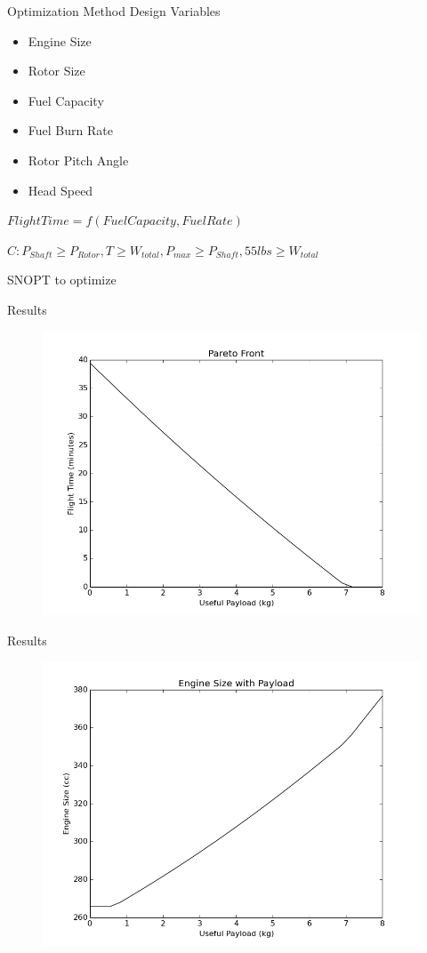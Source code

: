 \documentclass{beamer}
\begin{document}
\begin{frame}{Optimization Method}
	Design Variables
	\begin{itemize}
		\item{Engine Size}
		\item{Rotor Size}
		\item{Fuel Capacity}
		\item{Fuel Burn Rate}
		\item{Rotor Pitch Angle}
		\item{Head Speed}
	\end{itemize}
	
	$Flight Time = f(Fuel Capacity, Fuel Rate)$
	
	$C: P_{Shaft} \geq P_{Rotor}, T \geq W_{total}, P_{max} \geq P_{Shaft}, 55lbs \geq W_{total} $ 
	
	SNOPT to optimize

\end{frame}

\begin{frame}{Results}
	\begin{figure}
		\begin{center}
			\includegraphics[width=.70\textwidth]{../pareto_front.png}
			\label{fig:pareto}
		\end{center}
	\end{figure}
\end{frame}

\begin{frame}{Results}
	\begin{figure}
		\begin{center}
			\includegraphics[width=.70\textwidth]{../engine_size_vs_payload.png}
			\label{fig:pareto}
		\end{center}
	\end{figure}
\end{frame}
\end{document}
